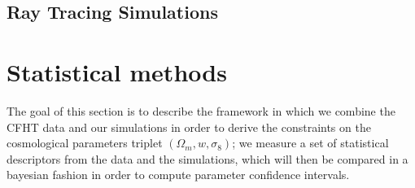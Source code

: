 \documentclass[reprint,aps,prd,superscriptaddress,showkeys]{revtex4-1}
\begin{document}
\subsection{Ray Tracing Simulations}
\label{raysim}


\section{Statistical methods}
The goal of this section is to describe the framework in which we combine the CFHT data and our simulations in order to derive the constraints on the cosmological parameters triplet $(\Omega_m,w,\sigma_8)$; we measure a set of statistical descriptors from the data and the simulations, which will then be compared in a bayesian fashion in order to compute parameter confidence intervals.
\end{document}

